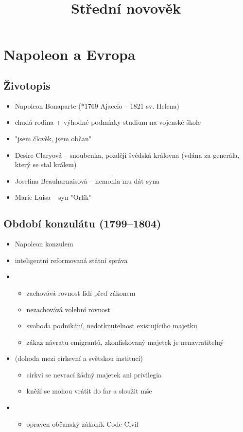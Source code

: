 \title{Střední novověk}


\section{Napoleon a Evropa}
\subsection{Životopis}
\begin{itemize}
\item Napoleon Bonaparte (*1769 Ajaccio -- 1821 sv. Helena)
\item chudá rodina + výhodné podmínky \ra studium na vojenské škole
\item "jsem člověk, jsem občan"
\item Desire Claryová -- snoubenka, později švédská královna (vdána za generála, který se stal králem)
\item Josefina Beauharnaisová -- nemohla mu dát syna
\item Marie Luisa -- syn "Orlík"
\end{itemize}

\subsection{Období konzulátu (1799--1804)}
\begin{itemize}
\item Napoleon konzulem
\item inteligentní \ra reformovaná státní správa
\item {}
	\begin{itemize}
	\item zachovává rovnost lidí před zákonem
	\item nezachovává volební rovnost
	\item svoboda podnikání, nedotknutelnost existujícího majetku
	\item zákaz návratu emigrantů, zkonfiskovaný majetek je nenavratitelný
	\end{itemize}
\item {} (dohoda mezi církevní a světskou institucí)
	\begin{itemize}
	\item církvi se nevrací žádný majetek ani privilegia
	\item kněží se mohou vrátit do far a sloužit mše
	\end{itemize}
\item {}
	\begin{itemize}
	\item opraven občanský zákoník Code Civil
	\end{itemize}
\end{itemize}

